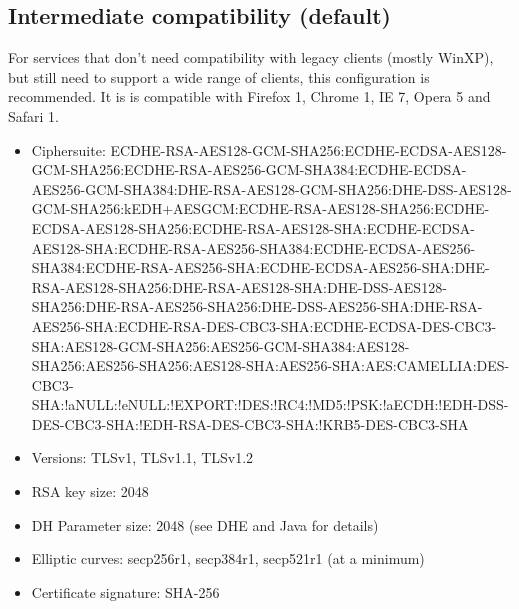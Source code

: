 \subsection{Intermediate compatibility (default)}
For services that don't need compatibility with legacy clients (mostly WinXP), but still need to support a wide range of clients, this configuration is recommended. It is is compatible with Firefox 1, Chrome 1, IE 7, Opera 5 and Safari 1.
\begin{itemize}
\item Ciphersuite: ECDHE-RSA-AES128-GCM-SHA256:ECDHE-ECDSA-AES128-GCM-SHA256:ECDHE-RSA-AES256-GCM-SHA384:ECDHE-ECDSA-AES256-GCM-SHA384:DHE-RSA-AES128-GCM-SHA256:DHE-DSS-AES128-GCM-SHA256:kEDH+AESGCM:ECDHE-RSA-AES128-SHA256:ECDHE-ECDSA-AES128-SHA256:ECDHE-RSA-AES128-SHA:ECDHE-ECDSA-AES128-SHA:ECDHE-RSA-AES256-SHA384:ECDHE-ECDSA-AES256-SHA384:ECDHE-RSA-AES256-SHA:ECDHE-ECDSA-AES256-SHA:DHE-RSA-AES128-SHA256:DHE-RSA-AES128-SHA:DHE-DSS-AES128-SHA256:DHE-RSA-AES256-SHA256:DHE-DSS-AES256-SHA:DHE-RSA-AES256-SHA:ECDHE-RSA-DES-CBC3-SHA:ECDHE-ECDSA-DES-CBC3-SHA:AES128-GCM-SHA256:AES256-GCM-SHA384:AES128-SHA256:AES256-SHA256:AES128-SHA:AES256-SHA:AES:CAMELLIA:DES-CBC3-SHA:!aNULL:!eNULL:!EXPORT:!DES:!RC4:!MD5:!PSK:!aECDH:!EDH-DSS-DES-CBC3-SHA:!EDH-RSA-DES-CBC3-SHA:!KRB5-DES-CBC3-SHA
\item Versions: TLSv1, TLSv1.1, TLSv1.2
\item RSA key size: 2048
\item DH Parameter size: 2048 (see DHE and Java for details)
\item Elliptic curves: secp256r1, secp384r1, secp521r1 (at a minimum)
\item Certificate signature: SHA-256
\end{itemize}
